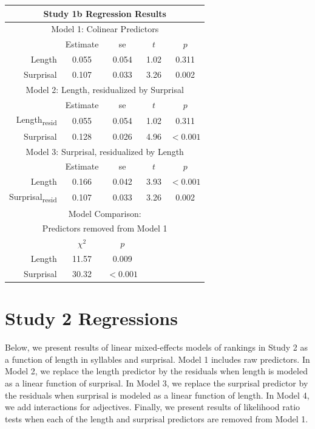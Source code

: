 \begin{appendices}
\vspace{4mm}

\noindent
\footnotesize{
\begin{tabular}{r|cccc}
\hline
\hline
\multicolumn{5}{c}{\textbf{Study 1b Regression Results}} \\
\hline
\hline
\multicolumn{5}{c}{Model 1: Colinear Predictors} \\
& Estimate & se & $t$ & $p$ \\
\hline
Length & 0.055 & 0.054 & 1.02 & 0.311 \\
Surprisal & 0.107 & 0.033 & 3.26 & 0.002 \\
\hline
\hline
\multicolumn{5}{c}{Model 2: Length, residualized by Surprisal} \\
& Estimate & se & $t$ & $p$ \\
\hline
Length\textsubscript{resid} & 0.055 & 0.054 & 1.02 & 0.311 \\
Surprisal & 0.128 & 0.026 & 4.96 & $<0.001$ \\
\hline
\hline
\multicolumn{5}{c}{Model 3: Surprisal, residualized by Length} \\
& Estimate & se & $t$ & $p$ \\
\hline
Length & 0.166 & 0.042 & 3.93 & $<0.001$ \\
Surprisal\textsubscript{resid} & 0.107 & 0.033 & 3.26 & 0.002 \\
\hline
\hline
\multicolumn{5}{c}{Model Comparison:} \\
\multicolumn{5}{c}{Predictors removed from Model 1} \\
& $\chi^2$ & $p$ \\
\hline
Length & 11.57 & 0.009 \\
Surprisal & 30.32 & $<0.001$ \\
\hline
\hline
\end{tabular}
}



\section{Study 2 Regressions}

Below, we present results of linear mixed-effects models of rankings in Study 2 as a function of length in syllables and surprisal.
Model 1 includes raw predictors.
In Model 2, we replace the length predictor by the residuals when length is modeled as a linear function of surprisal.
In Model 3, we replace the surprisal predictor by the residuals when surprisal is modeled as a linear function of length.
In Model 4, we add interactions for adjectives.
Finally, we present results of likelihood ratio tests when each of the length and surprisal predictors are removed from Model 1.


\end{appendices}
